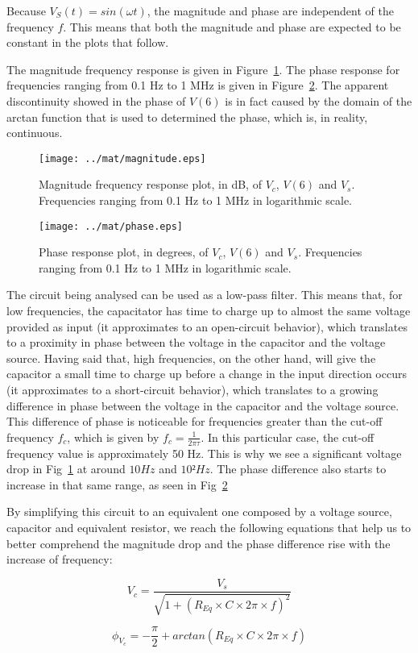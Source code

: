 Because $V_S(t) = sin(\omega t)$, the magnitude and phase are independent of the frequency $f$. This means that both the magnitude and phase are expected to be constant in the plots that follow.

The magnitude frequency response is given in Figure~\ref{fig:mag}.
The phase response for frequencies ranging from 0.1 Hz to 1 MHz is given in Figure~\ref{fig:phase}. The apparent discontinuity showed in the phase of $V(6)$ is in fact caused by the domain of the arctan function that is used to determined the phase, which is, in reality, continuous.

\begin{figure}[h] \centering
\texttt{[image: ../mat/magnitude.eps]}
	\caption{Magnitude frequency response plot, in dB, of $V_{c}$, $V(6)$ and $V_{s}$. Frequencies ranging from 0.1 Hz to 1 MHz in logarithmic scale.}
        \label{fig:mag}
\end{figure}


\begin{figure}[h] \centering
\texttt{[image: ../mat/phase.eps]}
	\caption{Phase response plot, in degrees, of $V_{c}$, $V(6)$ and $V_{s}$. Frequencies ranging from 0.1 Hz to 1 MHz in logarithmic scale.}
        \label{fig:phase}
\end{figure}



The circuit being analysed can be used as a low-pass filter. This means that, for low frequencies, the capacitator has time to charge up to almost the same voltage provided as input (it approximates to an open-circuit behavior), which translates to a proximity in phase between the voltage in the capacitor and the voltage source. Having said that, high frequencies, on the other hand, will give the capacitor a small time to charge up before a change in the input direction occurs (it approximates to a short-circuit behavior), which translates to a growing difference in phase between the voltage in the capacitor and the voltage source. This difference of phase is noticeable for frequencies greater than the cut-off frequency $f_c$, which is given by $f_c = \frac{1}{2\pi\tau}$. In this particular case, the cut-off frequency value is approximately 50 Hz. This is why we see a significant voltage drop in Fig~\ref{fig:mag} at around $10 Hz$ and $10² Hz$. The phase difference also starts to increase in that same range, as seen in Fig~\ref{fig:phase}

By simplifying this circuit to an equivalent one composed by a voltage source, capacitor and equivalent resistor, we reach the following equations that help us to better comprehend the magnitude drop and the phase difference rise with the increase of frequency:

\begin{equation}
  V_c = \frac{V_s}{\sqrt{1 + (R_{Eq}\times C\times 2\pi\times f)^2}}
  \label{eq:equivalent1}
\end{equation}

\begin{equation}
  \phi_{V_c} = -\frac{\pi}{2} + arctan(R_{Eq}\times C\times 2\pi\times f)
  \label{eq:equivalent2}
\end{equation}

